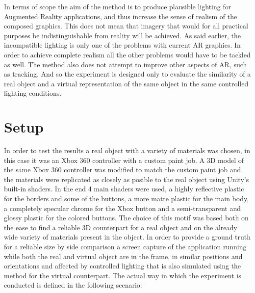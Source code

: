 
 In terms of scope the aim of the method is to produce plausible lighting for Augmented Reality applications, and thus increase the sense of realism of the composed graphics. This does not mean that imagery that would for all practical purposes be indistinguishable from reality will be achieved. As said earlier, the incompatible lighting is only one of the problems with current AR graphics. In order to achieve complete realism all the other problems would have to be tackled as well. The method also does not attempt to improve other aspects of AR, such as tracking. And so the experiment is designed only to evaluate the similarity of a real object and a virtual representation of the same object in the same controlled lighting conditions.\newline
\section{Setup}
In order to test the results a real object with a variety of materials was chosen, in this case it was an Xbox 360 controller with a custom paint job. A 3D model of the same Xbox 360 controller was modified to match the custom paint job and the materials were replicated as closely as posible to the real object using Unity's built-in shaders. In the end 4 main shaders were used, a highly reflective plastic for the borders and some of the buttons, a more matte plastic for the main body, a completely specular chrome for the Xbox button and a semi-transparent and glossy plastic for the colored buttons. The choice of this motif was based both on the ease to find a reliable 3D counterpart for a real object and on the already wide variety of materials present in the object.\newline
In order to provide a ground truth for a reliable size by side comparison a screen capture of the application running while both the real and virtual object are in the frame, in similar positions and orientations and affected by controlled lighting that is also simulated using the method for the virtual counterpart.\newline
The actual way in which the experiment is conducted is defined in the following scenario:
